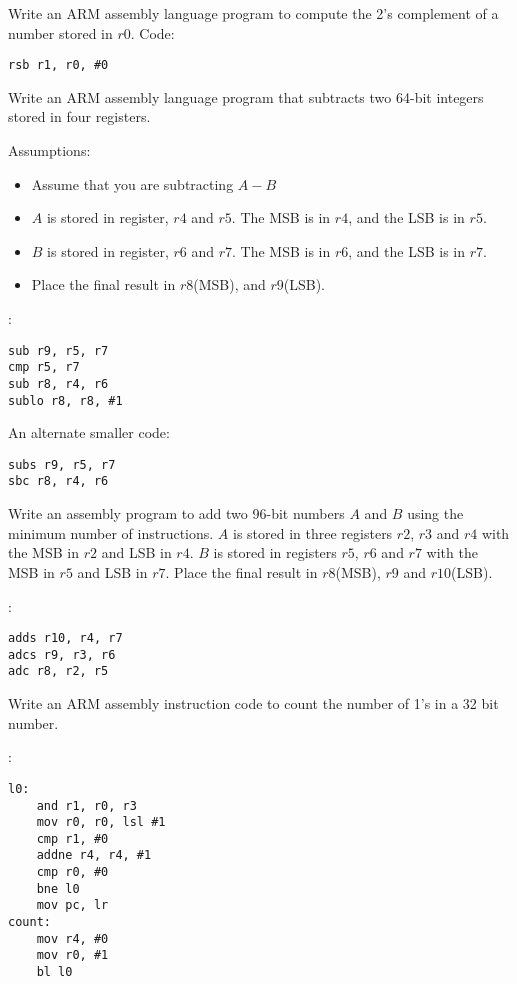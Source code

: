\begin{ExerciseList}

\Exercise
Write an ARM assembly language program to compute the
2's complement of a number stored in $r0$.
\Answer
Code:
\begin{Verbatim}[frame=single]
rsb r1, r0, #0
\end{Verbatim}



\Exercise
Write an ARM assembly language program that subtracts two 
64-bit integers stored in four registers.

Assumptions:
\begin{itemize}
\item Assume that you are subtracting $A - B$
\item $A$ is stored in register, $r4$ and $r5$. The MSB is in $r4$, and the LSB is in $r5$.
\item $B$ is stored in register, $r6$ and $r7$. The MSB is in $r6$, and the LSB is in $r7$.
\item Place the final result in $r8$(MSB), and $r9$(LSB). 
\end{itemize}

\Answer :
\begin{Verbatim}[frame=single]
sub r9, r5, r7
cmp r5, r7
sub r8, r4, r6
sublo r8, r8, #1
\end{Verbatim}
An alternate smaller code:
\begin{Verbatim}[frame=single]
subs r9, r5, r7
sbc r8, r4, r6
\end{Verbatim}


\Exercise
Write an assembly program to add two 96-bit numbers $A$
 and $B$ using the minimum number of instructions.
$A$ is stored in three registers $r2$, $r3$ and $r4$ 
with the MSB in $r2$ and LSB in $r4$.
$B$ is stored in registers $r5$, $r6$ and $r7$ with the
 MSB in $r5$ and LSB in $r7$. Place the final result in $r8$(MSB), $r9$ and $r10$(LSB).

\Answer :
\begin{Verbatim}[frame=single]
adds r10, r4, r7
adcs r9, r3, r6
adc r8, r2, r5
\end{Verbatim}

\Exercise
Write an ARM assembly instruction code to count the number of 1's in a 32 bit number.

\Answer :
\begin{Verbatim}[frame=single]
l0:
	and r1, r0, r3
	mov r0, r0, lsl #1
	cmp r1, #0
	addne r4, r4, #1
	cmp r0, #0
	bne l0
	mov pc, lr
count:
	mov r4, #0
	mov r0, #1
	bl l0
\end{Verbatim}



\end{ExerciseList}
